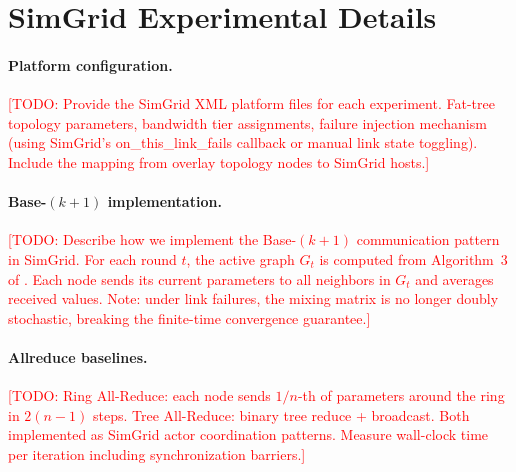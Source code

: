 \documentclass{article}
\begin{document}
\section{SimGrid Experimental Details}
\label{app:simgrid}

\paragraph{Platform configuration.}
\textcolor{red}{[TODO: Provide the SimGrid XML platform files for each
experiment.  Fat-tree topology parameters, bandwidth tier assignments,
failure injection mechanism (using SimGrid's on\_this\_link\_fails callback
or manual link state toggling).  Include the mapping from overlay
topology nodes to SimGrid hosts.]}

\paragraph{Base-$(k{+}1)$ implementation.}
\textcolor{red}{[TODO: Describe how we implement the Base-$(k{+}1)$
communication pattern in SimGrid.  For each round $t$, the active graph
$G_t$ is computed from Algorithm~3 of \cite{takezawa2023base}.  Each
node sends its current parameters to all neighbors in $G_t$ and
averages received values.  Note: under link failures, the mixing matrix
is no longer doubly stochastic, breaking the finite-time convergence
guarantee.]}

\paragraph{Allreduce baselines.}
\textcolor{red}{[TODO: Ring All-Reduce: each node sends $1/n$-th of
parameters around the ring in $2(n{-}1)$ steps.  Tree All-Reduce:
binary tree reduce + broadcast.  Both implemented as SimGrid actor
coordination patterns.  Measure wall-clock time per iteration including
synchronization barriers.]}

\newpage

\end{document}
